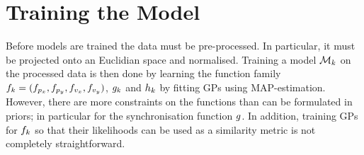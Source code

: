 


\section{Training the Model}
Before models are trained the data must be pre-processed. In
particular, it must be projected onto an Euclidian space and normalised.
Training a model $\mathcal{M}_{k}$ on the processed data is then done by learning
the function family $f_{k} = (f_{p_x}, f_{p_y},
f_{v_x}, f_{v_y})$, $g_{k}$ and $h_{k}$ by
fitting GPs using MAP-estimation. 
However, there are more constraints on the functions than can be formulated in
priors; in particular for the synchronisation function $g$. 
In addition, training GPs for $f_{k}$ so that their likelihoods
can be used as a similarity metric is not completely straightforward. 

